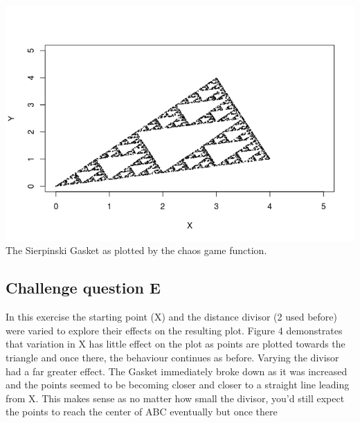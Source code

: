 \documentclass{article}
\begin{document}
\begin{center}
  \includegraphics[width=\textwidth]{../Results/question_22.jpeg}
   {The Sierpinski Gasket as plotted by the chaos game function.}
\end{center}

\subsection*{Challenge question E}
In this exercise the starting point (X) and the distance divisor (2 used before) were varied to explore
their effects on the resulting plot. Figure 4 demonstrates that variation in X has
little effect on the plot as points are plotted towards the triangle and once there, 
the behaviour continues as before. Varying the divisor had a far greater effect. The Gasket 
immediately broke down as it was increased and the points seemed to be becoming closer and closer 
to a straight line leading from X. This makes sense as no matter how small the divisor,
you'd still expect the points to reach the center of ABC eventually but once there 
\end{document}
